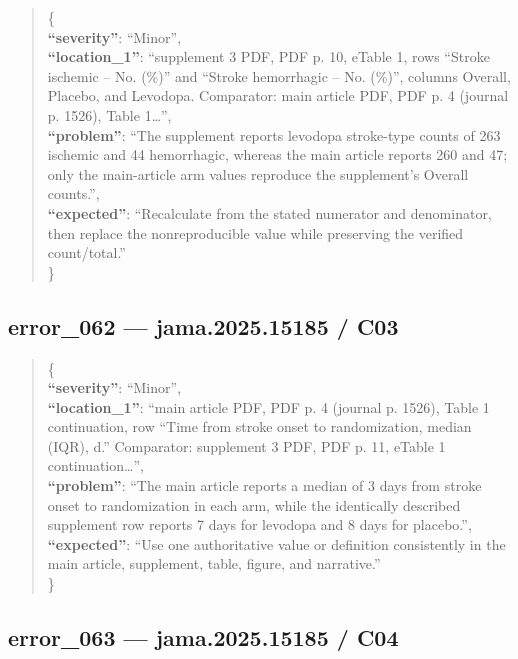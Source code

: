 \documentclass[
  letterpaper,
  9pt]{extreport}
\begin{document}
\begin{quote}
\{\\
\textbf{``severity''}: ``Minor'',\\
\textbf{``location\_1''}: ``supplement 3 PDF, PDF p. 10, eTable 1, rows
``Stroke ischemic -- No. (\%)'' and ``Stroke hemorrhagic -- No. (\%)'',
columns Overall, Placebo, and Levodopa. Comparator: main article PDF,
PDF p. 4 (journal p. 1526), Table 1\ldots{}'',\\
\textbf{``problem''}: ``The supplement reports levodopa stroke-type
counts of 263 ischemic and 44 hemorrhagic, whereas the main article
reports 260 and 47; only the main-article arm values reproduce the
supplement's Overall counts.'',\\
\textbf{``expected''}: ``Recalculate from the stated numerator and
denominator, then replace the nonreproducible value while preserving the
verified count/total.''\\
\}
\end{quote}

\hypertarget{error_062--jama202515185--c03}{%
\subsection{error\_062 --- jama.2025.15185 /
C03}\label{error_062--jama202515185--c03}}

\begin{quote}
\{\\
\textbf{``severity''}: ``Minor'',\\
\textbf{``location\_1''}: ``main article PDF, PDF p. 4 (journal p.
1526), Table 1 continuation, row ``Time from stroke onset to
randomization, median (IQR), d.'' Comparator: supplement 3 PDF, PDF p.
11, eTable 1 continuation\ldots{}'',\\
\textbf{``problem''}: ``The main article reports a median of 3 days from
stroke onset to randomization in each arm, while the identically
described supplement row reports 7 days for levodopa and 8 days for
placebo.'',\\
\textbf{``expected''}: ``Use one authoritative value or definition
consistently in the main article, supplement, table, figure, and
narrative.''\\
\}
\end{quote}

\hypertarget{error_063--jama202515185--c04}{%
\subsection{error\_063 --- jama.2025.15185 /
C04}\label{error_063--jama202515185--c04}}
\end{document}
